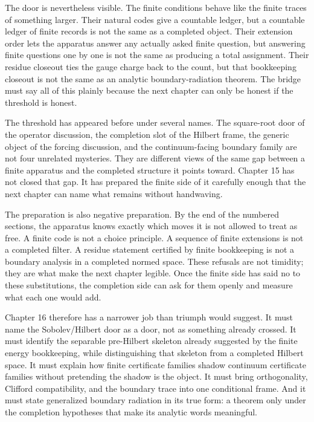 The door is nevertheless visible. The finite conditions behave like the finite
traces of something larger. Their natural codes give a countable ledger, but a
countable ledger of finite records is not the same as a completed object. Their
extension order lets the apparatus answer any actually asked finite question,
but answering finite questions one by one is not the same as producing a total
assignment. Their residue closeout ties the gauge charge back to the count, but
that bookkeeping closeout is not the same as an analytic boundary-radiation
theorem. The bridge must say all of this plainly because the next chapter can
only be honest if the threshold is honest.

The threshold has appeared before under several names. The square-root door of
the operator discussion, the completion slot of the Hilbert frame, the generic
object of the forcing discussion, and the continuum-facing boundary family are
not four unrelated mysteries. They are different views of the same gap between a
finite apparatus and the completed structure it points toward. Chapter 15 has
not closed that gap. It has prepared the finite side of it carefully enough that
the next chapter can name what remains without handwaving.

The preparation is also negative preparation. By the end of the numbered
sections, the apparatus knows exactly which moves it is not allowed to treat as
free. A finite code is not a choice principle. A sequence of finite extensions
is not a completed filter. A residue statement certified by finite bookkeeping
is not a boundary analysis in a completed normed space. These refusals are not
timidity; they are what make the next chapter legible. Once the finite side has
said no to these substitutions, the completion side can ask for them openly and
measure what each one would add.

Chapter 16 therefore has a narrower job than triumph would suggest. It must
name the Sobolev/Hilbert door as a door, not as something already crossed. It
must identify the separable pre-Hilbert skeleton already suggested by the finite
energy bookkeeping, while distinguishing that skeleton from a completed Hilbert
space. It must explain how finite certificate families shadow continuum
certificate families without pretending the shadow is the object. It must bring
orthogonality, Clifford compatibility, and the boundary trace into one
conditional frame. And it must state generalized boundary radiation in its true
form: a theorem only under the completion hypotheses that make its analytic
words meaningful.

